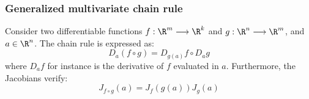 \subsubsection{Generalized multivariate chain rule}
Consider two differentiable functions $f:\R^m\longrightarrow\R^k$ and $g:\R^n\longrightarrow\R^m$, and $a\in\R^n$. The chain rule is expressed as:
\begin{equation}
    D_a(f\circ g) = D_{g(a)}f\circ D_ag
\end{equation}
where $D_af$ for instance is the derivative of $f$ evaluated in $a$. Furthermore, the Jacobians verify:
\begin{equation}
    J_{f\circ g}(a)=J_f(g(a)) J_g(a)
\end{equation}